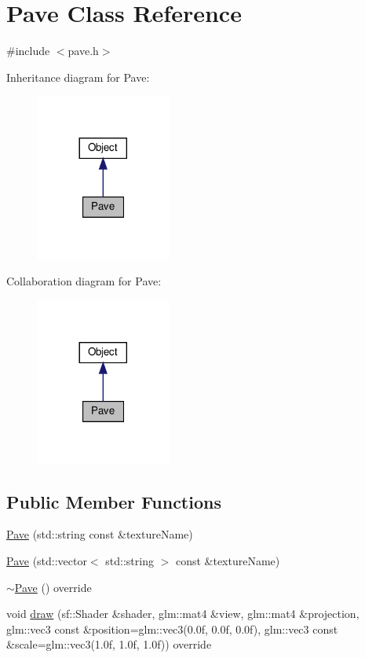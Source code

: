 \hypertarget{classPave}{}\section{Pave Class Reference}
\label{classPave}


{\ttfamily \#include $<$pave.\+h$>$}



Inheritance diagram for Pave\+:\nopagebreak
\begin{figure}[H]
\begin{center}
\leavevmode
\includegraphics[width=125pt]{classPave__inherit__graph}
\end{center}
\end{figure}


Collaboration diagram for Pave\+:\nopagebreak
\begin{figure}[H]
\begin{center}
\leavevmode
\includegraphics[width=125pt]{classPave__coll__graph}
\end{center}
\end{figure}
\subsection*{Public Member Functions}
\begin{DoxyCompactItemize}
\item 
\hyperlink{classPave_a7537278f91075d65387b8fdb5bed3670}{Pave} (std\+::string const \&texture\+Name)
\item 
\hyperlink{classPave_a78c2b5d920edf472b6f80b914a98b497}{Pave} (std\+::vector$<$ std\+::string $>$ const \&texture\+Name)
\item 
\hyperlink{classPave_ab171241ed7514bb59f563212b9844d6c}{$\sim$\+Pave} () override
\item 
void \hyperlink{classPave_a4dc3714e64f470c05726b7c7200d21e0}{draw} (sf\+::\+Shader \&shader, glm\+::mat4 \&view, glm\+::mat4 \&projection, glm\+::vec3 const \&position=glm\+::vec3(0.\+0f, 0.\+0f, 0.\+0f), glm\+::vec3 const \&scale=glm\+::vec3(1.\+0f, 1.\+0f, 1.\+0f)) override
\end{DoxyCompactItemize}
